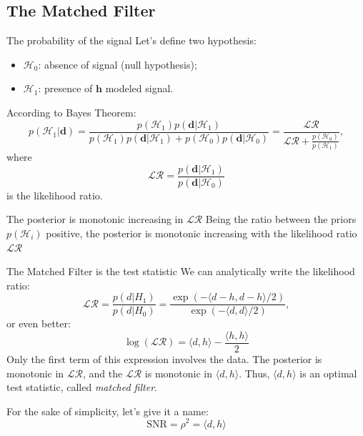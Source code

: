 \documentclass[
10pt,
aspectratio=169,
]{beamer}
\begin{document}
\subsection{The Matched Filter}

\begin{frame}{The probability of the signal}
Let's define two hypothesis:
\begin{itemize}
    \item $\mathcal{H}_0$: absence of signal (null hypothesis);
    \item $\mathcal{H}_1$: presence of $\boldsymbol{h}$ modeled signal.
\end{itemize}

According to Bayes Theorem:
    \begin{equation}
        p(\mathcal{H}_1|\boldsymbol{d}) = \frac{p(\mathcal{H}_1)p(\boldsymbol{d}|\mathcal{H}_1)}{p(\mathcal{H}_1)p(\boldsymbol{d}|\mathcal{H}_1) + p(\mathcal{H}_0)p(\boldsymbol{d}|\mathcal{H}_0)}=\frac{\mathcal{L}\mathcal{R}}{\mathcal{L}\mathcal{R}+ \frac{p(\mathcal{H}_0)}{p(\mathcal{H}_1)}},
    \end{equation}
    where \[\mathcal{L}\mathcal{R} = \frac{p(\boldsymbol{d}|\mathcal{H}_1)}{p(\boldsymbol{d}|\mathcal{H}_0)}\]
    is the likelihood ratio.
    \begin{exampleblock}{The posterior is monotonic increasing in $\mathcal{L}\mathcal{R}$}
    Being the ratio between the priors $p(\mathcal{H}_i)$ positive, the posterior is monotonic increasing with the likelihood ratio $\mathcal{L}\mathcal{R}$
    \end{exampleblock}
\end{frame}

\begin{frame}{The Matched Filter is the test statistic}
We can analytically write the likelihood ratio:
\[\mathcal{L}\mathcal{R} = \frac{p(d|H_1)}{p(d|H_0)} = \frac{\exp\left(-\langle d - h, d - h \rangle/2\right)}{\exp\left(-\langle d, d \rangle/2\right)},\]
or even better:
\[
\log(\mathcal{L}\mathcal{R}) = \langle d, h \rangle - \frac{\langle h, h \rangle}{2}
\]
 Only the first term of this expression involves the data.  The posterior is monotonic in $\mathcal{L}\mathcal{R}$, and the $\mathcal{L}\mathcal{R}$ is monotonic in  $\langle d, h \rangle$. Thus, $\langle d, h \rangle$ is an optimal test statistic, called \textit{matched filter}.
 
 For the sake of simplicity, let's give it a name:
 \[
\text{SNR} = \rho^2 = \langle d, h \rangle
\]
   
\end{frame}
\end{document}
